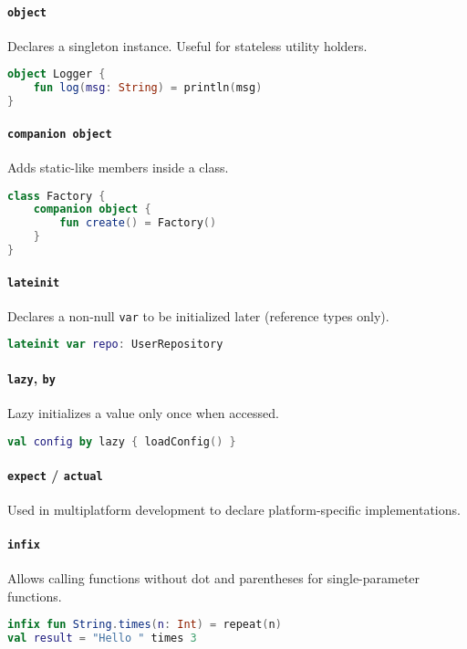\documentclass[a4paper,12pt]{article}
\begin{document}
\paragraph{\texttt{object}} Declares a singleton instance. Useful for stateless utility holders.
\begin{lstlisting}[language=Kotlin]
object Logger {
    fun log(msg: String) = println(msg)
}
\end{lstlisting}

\paragraph{\texttt{companion object}} Adds static-like members inside a class.
\begin{lstlisting}[language=Kotlin]
class Factory {
    companion object {
        fun create() = Factory()
    }
}
\end{lstlisting}

\paragraph{\texttt{lateinit}} Declares a non-null \texttt{var} to be initialized later (reference types only).
\begin{lstlisting}[language=Kotlin]
lateinit var repo: UserRepository
\end{lstlisting}

\paragraph{\texttt{lazy}, \texttt{by}} Lazy initializes a value only once when accessed.
\begin{lstlisting}[language=Kotlin]
val config by lazy { loadConfig() }
\end{lstlisting}

\paragraph{\texttt{expect} / \texttt{actual}} Used in multiplatform development to declare platform-specific implementations.

\paragraph{\texttt{infix}} Allows calling functions without dot and parentheses for single-parameter functions.
\begin{lstlisting}[language=Kotlin]
infix fun String.times(n: Int) = repeat(n)
val result = "Hello " times 3
\end{lstlisting}
\end{document}
